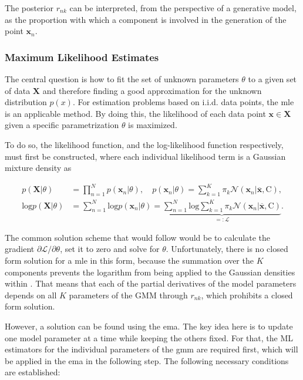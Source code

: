 \documentclass[../../../main.tex]{subfiles}
\begin{document}
The posterior $r_{nk}$ can be interpreted, from the perspective of a generative model, as the proportion with which a component is involved in the generation of the point $\bm{x}_n$.

\subsubsection{Maximum Likelihood Estimates}

The central question is how to fit the set of unknown parameters $\theta$ to a given set of data $\bm{X}$ and therefore finding a good approximation for the unknown distribution $p(x)$. For estimation problems based on i.i.d. data points, the \acrfull{mle} is an applicable method. \cite[p. 317]{dei_2020} By doing this, the likelihood of each data point $\bm{x} \in \bm{X}$ given a specific parametrization $\theta$ is maximized. 

\newpage

To do so, the likelihood function, and the log-likelihood function respectively, must first be constructed, where each individual likelihood term is a Gaussian mixture density as

\begin{equation*}
    \begin{aligned}
        p(\bm{X}|\theta) &= \prod\limits_{n=1}^Np(\bm{x}_n|\theta), \quad p(\bm{x}_n|\theta)=\sum\limits^K_{k=1}\pi_k\mathcal{N}(\bm{x}_n| \overline{\bm{x}}, \bm{\mathrm{C}}),\\[5pt]
        \mathrm{log}p(\bm{X}|\theta) &= \sum\limits_{n=1}^N \mathrm{log} p(\bm{x}_n|\theta) = \underbrace{ \sum\limits_{n=1}^N \mathrm{log} \sum\limits_{k=1}^K \pi_k \mathcal{N}(\bm{x}_n | \overline{\bm{x}}, \bm{\mathrm{C}})}_{=:\mathcal{L}}.
    \end{aligned}
\end{equation*}

The common solution scheme that would follow would be to calculate the gradient $\partial{\mathcal{L}}/\partial{\theta}$, set it to zero and solve for $\theta$. Unfortunately, there is no closed form solution for a \acrshort{mle} in this form, because the summation over the $K$ components prevents the logarithm from being applied to the Gaussian densities within \cite[p. 435]{bis_2006}. That means that each of the partial derivatives of the model parameters depends on all $K$ parameters of the GMM through $r_{nk}$, which prohibits a closed form solution. 

However, a solution can be found using the \acrshort{ema}. The key idea here is to update one model parameter at a time while keeping the others fixed. For that, the ML estimators for the individual parameters of the \acrshort{gmm} are required first, which will be applied in the \acrshort{ema} in the following step. The following necessary conditions are established:
\end{document}
